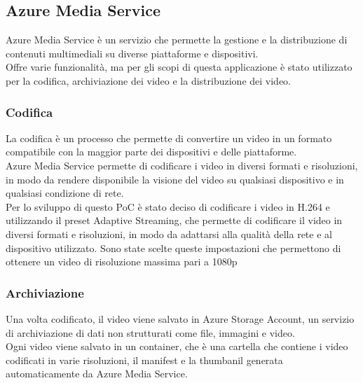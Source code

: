 \subsection{Azure Media Service}
Azure Media Service è un servizio che permette la gestione e la distribuzione di contenuti multimediali su diverse piattaforme e dispositivi.\\
Offre varie funzionalità, ma per gli scopi di questa applicazione è stato utilizzato per la codifica, archiviazione dei video e la distribuzione dei video.\\

\subsubsection{Codifica}
La codifica è un processo che permette di convertire un video in un formato compatibile con la maggior parte dei dispositivi e delle piattaforme.\\
Azure Media Service permette di codificare i video in diversi formati e risoluzioni, in modo da rendere disponibile la visione del video su qualsiasi dispositivo e in qualsiasi condizione di rete.\\
Per lo sviluppo di questo PoC è stato deciso di codificare i video in H.264 e utilizzando il preset Adaptive Streaming, che permette di codificare il video in diversi formati e risoluzioni, in modo da adattarsi alla qualità della rete e al dispositivo utilizzato. Sono state scelte queste impostazioni che permettono di ottenere un video di risoluzione massima pari a 1080p 

\subsubsection{Archiviazione}
Una volta codificato, il video viene salvato in Azure Storage Account, un servizio di archiviazione di dati non strutturati come file, immagini e video.\\
Ogni video viene salvato in un container, che è una cartella che contiene i video codificati in varie risoluzioni, il manifest e la thumbanil generata automaticamente da Azure Media Service.\\

